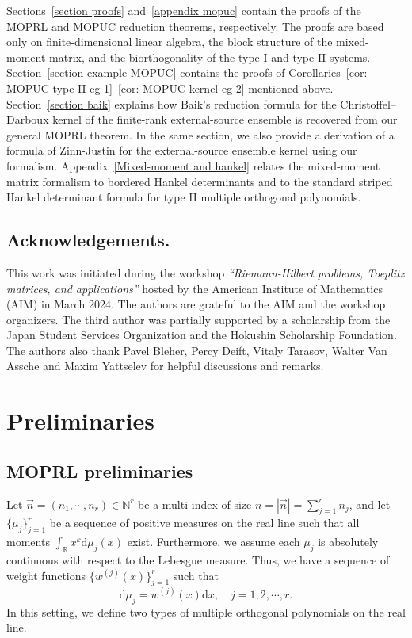 \documentclass[a4paper,10pt,leqno]{amsart}
\numberwithin{equation}{section}
\theoremstyle{remark}
\newcommand{\dd}{\mathrm{d}}
\newcommand{\R}{\mathbb{R}}
\newcommand{\N}{\mathbb{N}}
\begin{document}
Sections~\ref{section proofs} and~\ref{appendix mopuc} contain the proofs of the MOPRL and MOPUC reduction theorems,
respectively.  The proofs are based only on finite-dimensional linear algebra,
the block structure of the mixed-moment matrix, and the biorthogonality of the
type I and type II systems.  Section~\ref{section example MOPUC} contains the proofs of Corollaries~\ref{cor: MOPUC type II eg 1}--\ref{cor: MOPUC kernel eg 2} mentioned above.  Section~\ref{section baik} explains how Baik's reduction formula for
the Christoffel--Darboux kernel of the finite-rank external-source ensemble is
recovered from our general MOPRL theorem.  In the same section, we also provide a derivation of a formula
of Zinn-Justin \cite{ZinnJustin1997} for the external-source ensemble kernel using our formalism.  Appendix~\ref{Mixed-moment and hankel} relates the
mixed-moment matrix formalism to bordered Hankel determinants and to the
standard striped Hankel determinant formula for type II multiple orthogonal
polynomials.


\subsection*{Acknowledgements.} 
This work was initiated during the workshop \textit{``Riemann-Hilbert problems, Toeplitz matrices, and applications''} hosted by the American Institute of Mathematics (AIM) in March 2024. 
The authors are grateful to the AIM and the workshop organizers.
The third author was partially supported by a scholarship from the Japan Student Services Organization and the
Hokushin Scholarship Foundation.
The authors also thank Pavel Bleher, Percy Deift, Vitaly Tarasov, Walter Van Assche and Maxim Yattselev for helpful discussions and remarks. 

\section{Preliminaries} \label{section: prelim}

\subsection{MOPRL preliminaries}

Let $\vec{n} = (n_1, \cdots, n_r) \in \N^r$ be a multi-index of size $n = |\vec{n}| = \sum_{j=1}^r n_j$, and let $\{ \mu_j \}_{j=1}^r$ be a sequence of positive measures on the real line such that all moments $\int_\R x^k \dd \mu_j(x)$ exist.
Furthermore, we assume each $\mu_j$ is absolutely continuous with respect to the Lebesgue measure. Thus, we have a sequence of weight functions $\{w^{(j)}(x)\}_{j=1}^r$ such that
\[
\dd \mu_j = w^{(j)}(x) \dd x, \quad j = 1, 2, \cdots, r.
\]
In this setting, we define two types of multiple orthogonal polynomials on the real line.
\end{document}
